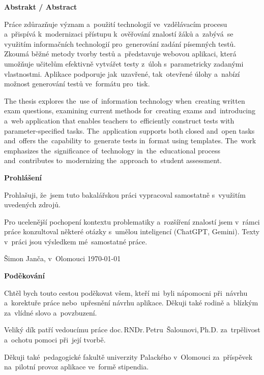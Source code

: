 \documentclass[11pt,a4paper]{report}
\newenvironment{singletonpage}[1]{
    \thispagestyle{empty} %
    \setlength{\parskip}{10pt} %
    \setlength{\parindent}{0pt}
    \vspace*{\stretch{1}} %
    \begin{center}      %
        \textbf{\Huge #1}\\[.4cm]
    \end{center}
}{
    \vspace*{\stretch{3}} %
    \clearpage          %
}
\begin{document}
    \begin{singletonpage}{Abstrakt / Abstract}
    
        Práce zdůrazňuje význam a~použití technologií ve~vzdělávacím procesu a~přispívá k~modernizaci přístupu k~ověřování znalostí žáků a~zabývá~se využitím informačních technologií pro~generování zadání písemných testů. Zkoumá běžné metody tvorby testů a~představuje webovou aplikaci, která umožňuje učitelům efektivně vytvářet testy z~úloh s~parametricky zadanými vlastnostmi. Aplikace podporuje jak~uzavřené, tak~otevřené úlohy a~nabízí možnost generování testů ve~formátu pro~tisk.

        The thesis explores the~use of~information technology when~creating written exam questions, examining current methods for~creating exams and~introducing a~web application that enables teachers to~efficiently construct tests with parameter-specified tasks. The~application supports both closed and~open tasks and~offers the~capability to~generate tests in~format using templates. The~work emphasizes the~significance of~technology in~the~educational process and~contributes to~modernizing the~approach to~student assessment.
    \end{singletonpage}
    
    \begin{singletonpage}{Prohlášení}
    
        Prohlašuji, že~jsem tuto bakalářskou práci vypracoval samostatně s~využitím uvedených zdrojů.

        Pro ucelenější pochopení kontextu problematiky a~rozšíření znalostí jsem v~rámci práce konzultoval některé otázky s~umělou inteligencí (ChatGPT, Gemini). Texty v~práci jsou výsledkem mé~samostatné práce.

        Šimon Janča, v~Olomouci \today
    \end{singletonpage}

    \begin{singletonpage}{Poděkování}
    
        Chtěl bych touto cestou poděkovat všem, kteří mi~byli nápomocni při~návrhu a~korektuře práce nebo~upřesnění návrhu aplikace. Děkuji také rodině a~blízkým za~vlídné slovo a~povzbuzení.
        
        Veliký dík patří vedoucímu práce doc.\,RNDr.\,Petru~Šalounovi,\,Ph.D. za~trpělivost a~ochotu pomoci při~její tvorbě.
        
        Děkuji také~pedagogické fakultě univerzity Palackého v~Olomouci za~příspěvek na~pilotní provoz aplikace ve~formě stipendia.
    \end{singletonpage}
    
\end{document}
